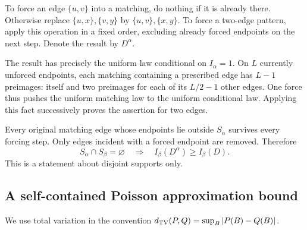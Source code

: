 \documentclass[11pt,letterpaper]{article}
\numberwithin{equation}{section}
\theoremstyle{definition}\newtheorem{definition}[theorem]{Definition}
\theoremstyle{remark}\newtheorem{remark}[theorem]{Remark}
\begin{document}
To force an edge $\{u,v\}$ into a matching, do nothing if it is
already there. Otherwise replace $\{u,x\},\{v,y\}$ by
$\{u,v\},\{x,y\}$. To force a two-edge pattern, apply this
operation in a fixed order, excluding already forced endpoints
on the next step. Denote the result by $D^\alpha$.

The result has precisely the uniform law conditional on
$I_\alpha=1$. On $L$ currently unforced endpoints, each
matching containing a prescribed edge has $L-1$ preimages:
itself and two preimages for each of its $L/2-1$ other edges.
One force thus pushes the uniform matching law to the uniform
conditional law. Applying this fact successively proves the
assertion for two edges.

Every original matching edge whose endpoints lie outside
$S_\alpha$ survives every forcing step. Only edges incident
with a forced endpoint are removed. Therefore
\begin{equation}\label{cgr:ld:eq:forcing-monotone}
 S_\alpha\cap S_\beta=\varnothing
 \quad\Longrightarrow\quad I_\beta(D^\alpha)\ge I_\beta(D).
\end{equation}
This is a statement about disjoint supports only.

\subsection*{A self-contained Poisson approximation bound}
We use total variation in the convention
$d_{\rm TV}(P,Q)=\sup_B|P(B)-Q(B)|$.
\end{document}
